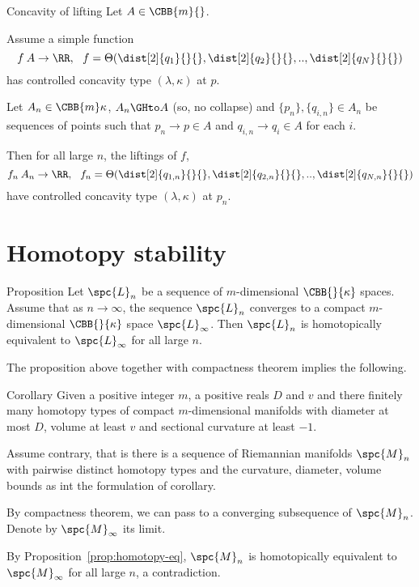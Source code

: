 \begin{thm}{Concavity of lifting} \label{lem:lifting}
Let $A\in\CBB{m}{}$.

Assume a simple function 
$$f\:A\to \RR,\ \ f=\Theta(\dist[2]{q_1}{}{},\dist[2]{q_2}{}{},..,\dist[2]{q_N}{}{})$$
has controlled concavity type $(\lambda,\kappa)$ at $p$.

Let $A_n\in\CBB{m}\kappa$,
$A_n\GHto A$ (so, no collapse) and $\{p_n\},\{q_{i,n}\}\in
A_n$ be sequences of points such that $p_n\to p\in A$ and  $q_{i,n}\to q_i\in A$
for each $i$.

Then for all large $n$, the liftings of $f$,
$$f_n\:A_n\to \RR,\ \
f_n=\Theta(\dist[2]{q_{1,n}}{}{},\dist[2]{q_{2,n}}{}{},..,\dist[2]{q_{N,n}}{}{})$$
have controlled concavity type $(\lambda,\kappa)$ at $p_n$. 
\end{thm}

\section{Homotopy stability}

\begin{thm}{Proposition}\label{prop:homotopy-eq}
Let $\spc{L}_n$ be a sequence of $m$-dimensional $\CBB{}{\kappa}$ spaces.
Assume that as $n\to\infty$, the sequence $\spc{L}_n$ converges to a compact  $m$-dimensional $\CBB{}{\kappa}$ space $\spc{L}_\infty$.
Then $\spc{L}_n$ is homotopically equivalent to $\spc{L}_\infty$ for all large $n$.
\end{thm}

The proposition above together with compactness theorem
implies the following.

\begin{thm}{Corollary}
Given a positive integer $m$, a  positive reals $D$ and $v$ and there finitely many homotopy types of compact $m$-dimensional manifolds with diameter at most $D$, volume at least $v$ and sectional curvature at least $-1$.
\end{thm}

Assume contrary,
that is there is a sequence of Riemannian manifolds $\spc{M}_n$ with pairwise distinct homotopy types and the curvature, diameter, volume bounds as int the formulation of corollary.

By compactness theorem, 
we can pass to a converging subsequence of $\spc{M}_n$.
Denote by $\spc{M}_\infty$ its limit.

By Proposition~\ref{prop:homotopy-eq}, $\spc{M}_n$ is homotopically equivalent to $\spc{M}_\infty$ for all large $n$,
a contradiction.
\qeds


